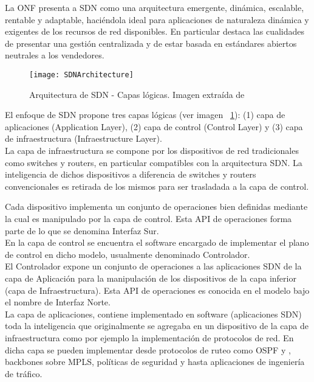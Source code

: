 La ONF presenta a SDN como una arquitectura emergente, dinámica, escalable, rentable y adaptable, haciéndola ideal para aplicaciones de naturaleza dinámica y exigentes de los recursos de red disponibles. En particular destaca las cualidades de presentar una gestión centralizada y de estar basada en estándares abiertos neutrales a los vendedores.\\

\begin{figure}[htbp!] 
\centering    
\texttt{[image: SDNArchitecture]}
\caption[Arquitectura de SDN - Capas lógicas]{Arquitectura de SDN - Capas lógicas. Imagen extraída de \cite{ONF}}
\label{fig:SDNArchitecture}
\end{figure}

El enfoque de SDN propone tres capas lógicas (ver imagen ~\ref{fig:SDNArchitecture}): (1) capa de aplicaciones (Application Layer), (2) capa de control (Control Layer) y (3) capa de infraestructura  
 (Infraestructure Layer).\\

La capa de infraestructura se compone por los dispositivos de red tradicionales como switches y routers, en particular compatibles con la arquitectura SDN. La inteligencia de dichos dispositivos a diferencia de switches y routers convencionales es retirada de los mismos para ser trasladada a la capa de control.

Cada dispositivo implementa un conjunto de operaciones bien definidas mediante la cual es manipulado por la capa de control. Esta API de operaciones forma parte de lo que se denomina Interfaz Sur.
\\

En la capa de control se encuentra el software encargado de implementar el plano de control en dicho modelo, usualmente denominado Controlador.\\

El Controlador expone un conjunto de operaciones a las aplicaciones SDN de la capa de Aplicación para la manipulación de los dispositivos de la capa inferior (capa de Infraestructura).  Esta API de operaciones es conocida en el modelo bajo el nombre de Interfaz Norte.\\

La capa de aplicaciones, contiene implementado en software (aplicaciones SDN) toda la inteligencia que originalmente se agregaba en un dispositivo de la capa de infraestructura como por ejemplo la implementaci\'on de protocolos de red. En dicha capa se pueden implementar desde protocolos de ruteo como OSPF y , backbones sobre MPLS, políticas de seguridad y hasta aplicaciones de ingeniería de tráfico.

